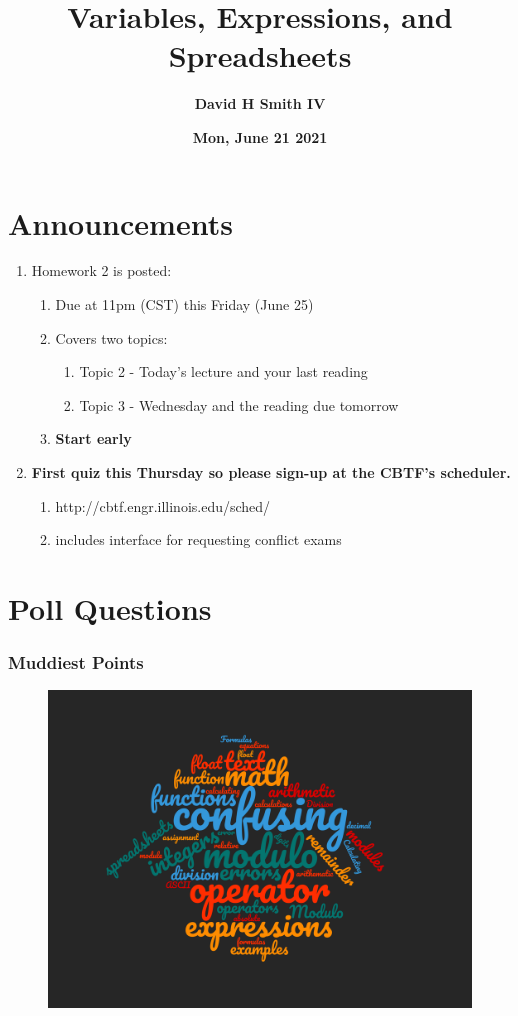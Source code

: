 \documentclass{beamer}
\title{\textbf{Variables, Expressions, and Spreadsheets}}
\author{\textbf{David H Smith IV}}
\institute[\textbf{UIUC}]{\textbf{University of Illinois Urbana-Champaign}}
\date{\textbf{Mon, June 21 2021}}
\begin{document}
\frame{\titlepage}

\section{Announcements}

\begin{frame}
  \begin{enumerate}
    \item Homework 2 is posted:
      \begin{enumerate}
        \item Due at 11pm (CST) this Friday (June 25)
        \item Covers two topics:
          \begin{enumerate}
            \item Topic 2 - Today's lecture and your last reading
            \item Topic 3 - Wednesday and the reading due tomorrow 
          \end{enumerate}
        \item \textbf{Start early}
      \end{enumerate}
    \item \textbf{First quiz this Thursday so please sign-up at the CBTF's scheduler.}
      \begin{enumerate}
        \item http://cbtf.engr.illinois.edu/sched/
        \item includes interface for requesting conflict exams
      \end{enumerate}
  \end{enumerate}
\end{frame}

\section{Poll Questions}

%
%
%
\begin{frame}[fragile]
  \frametitle{Muddiest Points}
  \begin{figure}
    \centering
    \includegraphics[width=.75\textwidth]{./imgs/muddiest-points-cloud-topic-2.png}
  \end{figure}
\end{frame}
\end{document}
